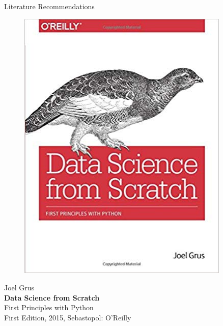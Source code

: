 \documentclass[main.tex]{subfiles}
\begin{document}
\begin{frame}{Literature Recommendations}
        \begin{minipage}{0.1\textwidth}
            \begin{figure}[H]
                \includegraphics[height=0.2\textheight, width=0.9\textwidth, left]{assets/book-covers/grus2015.jpg}
            \end{figure}
        \end{minipage}
        \begin{minipage}{0.32\textwidth}
            \footnotesize Joel Grus \normalsize \\[-0.5mm]
            \small \textbf{Data Science from Scratch} \\[-0.8mm]
            First Principles with Python \normalsize \\
            \tiny First Edition, 2015, Sebastopol: O'Reilly \normalsize
        \end{minipage}
        \begin{minipage}{0.1\textwidth}
            \begin{figure}[H]

\end{figure}
\end{minipage}
\end{frame}
\end{document}
